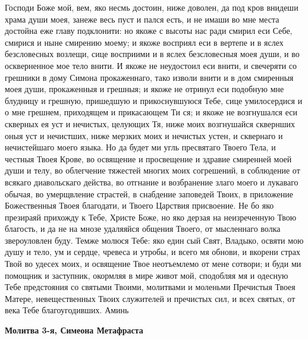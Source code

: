 Господи Боже мой, вем, яко несмь достоин, ниже доволен, да под кров внидеши храма души моея, занеже весь пуст и пался есть, и не имаши во мне места достойна еже главу подклонити: но якоже с высоты нас ради смирил еси Себе, смирися и ныне смирению моему; и якоже восприял еси в вертепе и в яслех безсловесных возлещи, сице восприими и в яслех безсловесныя моея души, и во оскверненное мое тело внити. И якоже не неудостоил еси внити, и свечеряти со грешники в дому Симона прокаженнаго, тако изволи внити и в дом смиренныя моея души, прокаженныя и грешныя; и якоже не отринул еси подобную мне блудницу и грешную, пришедшую и прикоснувшуюся Тебе, сице умилосердися и о мне грешнем, приходящем и прикасающем Ти ся; и якоже не возгнушался еси скверных ея уст и нечистых, целующих Тя, ниже моих возгнушайся сквернших оныя уст и нечистших, ниже мерзких моих и нечистых устен, и сквернаго и нечистейшаго моего языка. Но да будет ми угль пресвятаго Твоего Тела, и честныя Твоея Крове, во освящение и просвещение и здравие смиренней моей души и телу, во облегчение тяжестей многих моих согрешений, в соблюдение от всякаго диавольскаго действа, во отгнание и возбранение злаго моего и лукаваго обычая, во умерщвление страстей, в снабдение заповедей Твоих, в приложение Божественныя Твоея благодати, и Твоего Царствия присвоение. Не бо яко презираяй прихожду к Тебе, Христе Боже, но яко дерзая на неизреченную Твою благость, и да не на мнозе удаляяйся общения Твоего, от мысленнаго волка звероуловлен буду. Темже молюся Тебе: яко един сый Свят, Владыко, освяти мою душу и тело, ум и сердце, чревеса и утробы, и всего мя обнови, и вкорени страх Твой во удесех моих, и освящение Твое неотъемлемо от мене сотвори; и буди ми помощник и заступник, окормляя в мире живот мой, сподобляя мя и одесную Тебе предстояния со святыми Твоими, молитвами и моленьми Пречистыя Твоея Матере, невещественных Твоих служителей и пречистых сил, и всех святых, от века Тебе благоугодивших. Аминь


\medskip
\bfseries Молитва 3-я, Симеона Метафраста\normalfont{}\nopagebreak


